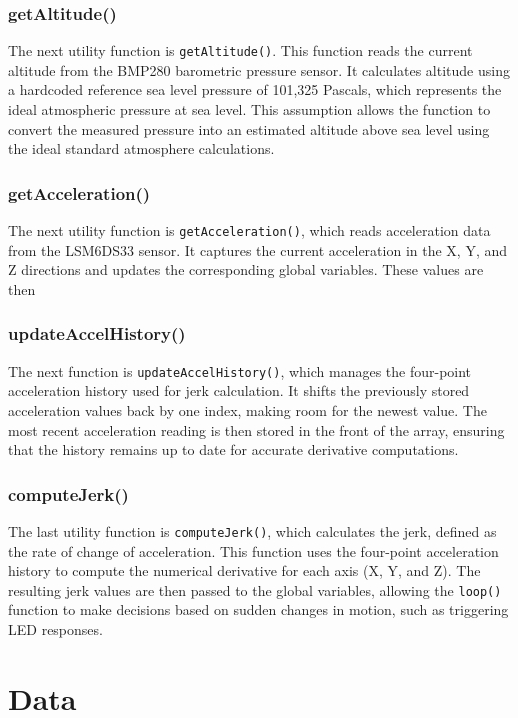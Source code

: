 \documentclass[12pt]{report}
\begin{document}
\subsubsection*{getAltitude()}
The next utility function is \texttt{getAltitude()}. This function reads the current altitude from the BMP280 barometric pressure sensor. It calculates altitude using a hardcoded reference sea level pressure of 101{,}325 Pascals, which represents the ideal atmospheric pressure at sea level. This assumption allows the function to convert the measured pressure into an estimated altitude above sea level using the ideal standard atmosphere calculations.

\subsubsection*{getAcceleration()}
The next utility function is \texttt{getAcceleration()}, which reads acceleration data from the LSM6DS33 sensor. It captures the current acceleration in the X, Y, and Z directions and updates the corresponding global variables. These values are then

\subsubsection*{updateAccelHistory()}
The next function is \texttt{updateAccelHistory()}, which manages the four-point acceleration history used for jerk calculation. It shifts the previously stored acceleration values back by one index, making room for the newest value. The most recent acceleration reading is then stored in the front of the array, ensuring that the history remains up to date for accurate derivative computations.

\subsubsection*{computeJerk()}
The last utility function is \texttt{computeJerk()}, which calculates the jerk, defined as the rate of change of acceleration. This function uses the four-point acceleration history to compute the numerical derivative for each axis (X, Y, and Z). The resulting jerk values are then passed to the global variables, allowing the \texttt{loop()} function to make decisions based on sudden changes in motion, such as triggering LED responses.

\section{Data}
\end{document}
